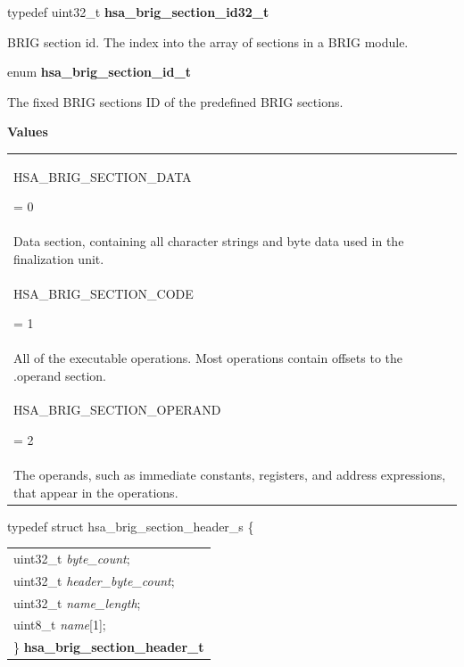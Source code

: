 \documentclass[final]{book}
\newcommand{\reffld}[1]{\textit{#1}}
\newcommand{\reftyp}[1]{#1}
\newcommand{\refenu}[1]{\reftyp{#1}}
\begin{document}
\begin{appendices}
\noindent\begin{tcolorbox}[nobeforeafter,arc=0mm,colframe=white,colback=lightgray,left=0mm]
typedef uint32_t  \hypertarget{group--FinalizerCoreApi-1ga1ae59088ab75219c8642a955406d620d}{\textbf{hsa_brig_section_id32_t}}
\end{tcolorbox}
BRIG section id. The index into the array of sections in a BRIG module.
\\

\noindent\begin{tcolorbox}[nobeforeafter,arc=0mm,colframe=white,colback=lightgray,left=0mm]
enum \hypertarget{group--FinalizerCoreApi-1ga1dda5c1d84d3f580d98c0ab50a72f8c0}{\textbf{hsa_brig_section_id_t}}
\end{tcolorbox}
The fixed BRIG sections ID of the predefined BRIG sections.

\noindent\textbf{Values}\\[-5mm]
\begin{longtable}{@{\hspace{2em}}p{\linewidth-2em}}
\hspace{-2em}\hypertarget{group--FinalizerCoreApi-1gga1dda5c1d84d3f580d98c0ab50a72f8c0a6ed78c6b756c742f11b03d1c5b753bd6}{\refenu{HSA_BRIG_SECTION_DATA}} = 0\\Data section, containing all character strings and byte data used in the finalization unit.\\[2mm]
\hspace{-2em}\hypertarget{group--FinalizerCoreApi-1gga1dda5c1d84d3f580d98c0ab50a72f8c0a893becd585bffab1016125407bac6c73}{\refenu{HSA_BRIG_SECTION_CODE}} = 1\\All of the executable operations. Most operations contain offsets to the .operand section.\\[2mm]
\hspace{-2em}\hypertarget{group--FinalizerCoreApi-1gga1dda5c1d84d3f580d98c0ab50a72f8c0adf68f8a3e988dcd8fabbfa26c8b6b3e2}{\refenu{HSA_BRIG_SECTION_OPERAND}} = 2\\The operands, such as immediate constants, registers, and address expressions, that appear in the operations.
\end{longtable}

\noindent\begin{tcolorbox}[breakable,nobeforeafter,arc=0mm,colframe=white,colback=lightgray,left=0mm]
typedef struct  hsa_brig_section_header_s \{
\vspace{-3.5mm}\begin{longtable}{@{}p{\textwidth}}
\hspace{1.7em}uint32_t \reffld{byte_count};\\
\hspace{1.7em}uint32_t \reffld{header_byte_count};\\
\hspace{1.7em}uint32_t \reffld{name_length};\\
\hspace{1.7em}uint8_t \reffld{name}[1];\\
\}  \hypertarget{group--FinalizerCoreApi-1ga623153601adfa153a3be70945d887327}{\textbf{hsa_brig_section_header_t}}
\end{longtable}


\end{tcolorbox}
\end{appendices}
\end{document}
